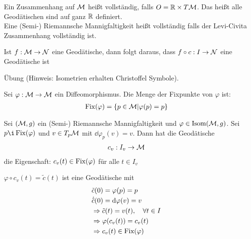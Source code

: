 \begin{defs}[Vollständigkeit]
Ein Zusammenhang auf $\mathcal{M}$ heißt vollständig, falls $O = \mathbb{R} \times T\mathcal{M}$.
Das heißt alle Geodätischen sind auf ganz $\mathbb{R}$ definiert.\\
Eine (Semi-) Riemannsche Mannigfaltigkeit heißt vollständig falls der Levi-Civita Zusammenhang vollständig ist.
\end{defs}
\begin{bem}
Ist $f: \mathcal{M} \to \mathcal{N}$ eine Geodätische, dann folgt daraus, dass $f\circ c: I \to \mathcal{N}$ eine Geodätische ist
\end{bem}
\begin{bew}
Übung (Hinweis: Isometrien erhalten Christoffel Symbole).
\end{bew}
Sei $\varphi : \mathcal{M} \to \mathcal{M}$ ein Diffeomorphismus.
Die Menge der Fixpunkte von $\varphi$ ist:
\begin{align}
\operatorname{Fix} (\varphi) = \{ p \in \mathcal{M} \vert \varphi (p) = p\} 
\end{align}
\begin{satz}
\label{satz:fixpunkte}
Sei $(\mathcal{M}, g)$ ein (Semi-) Riemannsche Mannigfaltigkeit  und $\varphi \in \operatorname{Isom} (\mathcal{M}, g)$.
Sei $p \i \fix (\varphi)$ und $v \in T_p \mathcal{M}$ mit $\dd \varphi_p (v) = v$.
Dann hat die Geodätische
\begin{align}
c_v : I_v \to \mathcal{M}
\end{align}
die Eigenschaft: $c_v(t) \in \operatorname{Fix} (\varphi)$ für alle $t \in I_v$
\end{satz}
\begin{bew}
$\varphi \circ c_v (t) = \tilde{c}(t)$ ist eine Geodätische mit
\begin{align*}
&\tilde{c}(0) = \varphi (p) = p\\
&\dot{\tilde{c}}(0) = \dd \varphi (v) = v\\
&\Rightarrow \tilde{c}(t) = v(t), \quad \forall t \in I\\
&\Rightarrow \varphi (c_v(t)) = c_v (t)\\
&\Rightarrow c_v (t) \in \operatorname{Fix} (\varphi)
\end{align*}
\end{bew}

